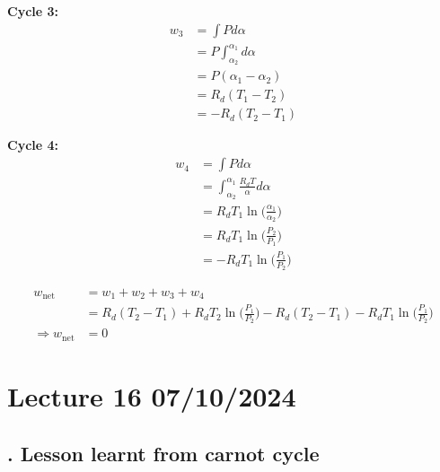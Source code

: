\documentclass[fleqn,10pt]{SelfArx} %
\newcommand{\myeqref}[1]{\textcolor{blue}{\textup{(\getrefnumber{#1})}}}
\begin{document}
\textbf{Cycle 3:}
\begin{align*}
    w_3 &= \int P d\alpha  \\
        &= P \int_{\alpha_2}^{\alpha_1} d\alpha \\
        &= P(\alpha_1 - \alpha_2) \\
        &= R_d(T_1-T_2) \\
        &= - R_d(T_2-T_1)
\end{align*}

\textbf{Cycle 4:}
\begin{align*}
    w_4 &= \int P d\alpha  \\
        &= \int_{\alpha_2}^{\alpha_1} \frac{R_d T}{\alpha} d\alpha \\
        &= R_d T_1 \ln \Big(\frac{\alpha_1}{\alpha_2}\Big) \\
        &= R_d T_1 \ln \Big(\frac{P_2}{P_1}\Big) \\
        &= - R_d T_1 \ln \Big(\frac{P_1}{P_2}\Big)
\end{align*}

\begin{align*}
    w_{\text{net}} &= w_1 + w_2 + w_3 + w_4 \\
                   &= R_d(T_2-T_1) + R_d T_2 \ln \Big(\frac{P_1}{P_2}\Big) - R_d(T_2-T_1) - R_d T_1 \ln \Big(\frac{P_1}{P_2}\Big) \\
    \Rightarrow w_{\text{net}} &= 0
\end{align*}

\clearpage

\section{Lecture 16 07/10/2024}

\subsection{. Lesson learnt from carnot cycle}
%
%
%
%
%
\end{document}
